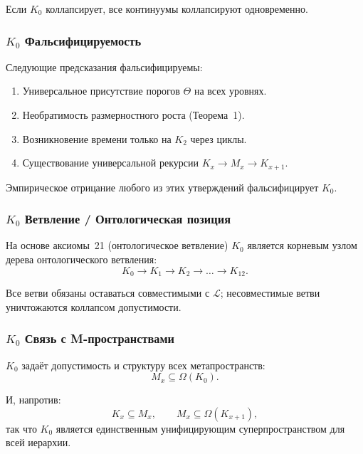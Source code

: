 Если $K_0$ коллапсирует, все континуумы коллапсируют одновременно.

\subsubsection{\texorpdfstring{$K_0$}{K_0} Фальсифицируемость}

Следующие предсказания фальсифицируемы:
\begin{enumerate}
    \item Универсальное присутствие порогов $\Theta$ на всех уровнях.
    \item Необратимость размерностного роста (Теорема~1).
    \item Возникновение времени только на $K_2$ через циклы.
    \item Существование универсальной рекурсии $K_x\to M_x\to K_{x+1}$.
\end{enumerate}

Эмпирическое отрицание любого из этих утверждений фальсифицирует $K_0$.

\subsubsection{\texorpdfstring{$K_0$}{K_0} Ветвление / Онтологическая позиция}

На основе аксиомы~21 (онтологическое ветвление) $K_0$ является корневым
узлом дерева онтологического ветвления:
\[
K_0 \rightarrow K_1 \rightarrow K_2 \rightarrow \dots \rightarrow K_{12}.
\]

Все ветви обязаны оставаться совместимыми с $\mathcal{L}$; несовместимые
ветви уничтожаются коллапсом допустимости.

\subsubsection{\texorpdfstring{$K_0$}{K_0} Связь с M-пространствами}

$K_0$ задаёт допустимость и структуру всех метапространств:
\[
M_x \subseteq \Omega(K_0).
\]

И, напротив:
\[
K_x \subseteq M_x,
\qquad
M_x \subseteq \Omega(K_{x+1}),
\]
так что $K_0$ является единственным унифицирующим суперпространством для
всей иерархии.
